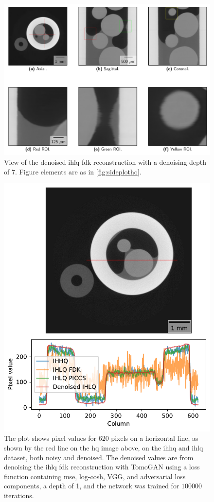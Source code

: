 \begin{figure}[htbp]
  \centering
  \includegraphics[width=.85\textwidth]{figures/kimrobertdepth7-x475y620s250.pdf}
  \caption[View of IHLQ FDK denoised with a depth of 7]{View of the denoised \acrshort{ihlq} \acrshort{fdk} reconstruction with a denoising depth of 7. Figure elements are as in \cref{fig:sideplothq}. }
  \label{fig:sideplotdepth7}
\end{figure}

\begin{figure}[htbp]
  \centering
  \includegraphics[width=.85\textwidth]{figures/kimrobertline.pdf}
  \caption[Line plot of IHHQ and IHLQ, noisy and denoised]{The plot shows pixel values for 620 pixels on a horizontal line, as shown by the red line on the \acrshort{hq} image above, on the \acrshort{ihhq} and \acrshort{ihlq} dataset, both noisy and denoised. The denoised values are from denoising the \acrshort{ihlq} \acrshort{fdk} reconstruction with TomoGAN using a loss function containing \acrshort{mse}, log-cosh, VGG, and adversarial loss components, a depth of 1, and the network was trained for $100 000$ iterations. }
  \label{fig:kimrobertline}
\end{figure}

